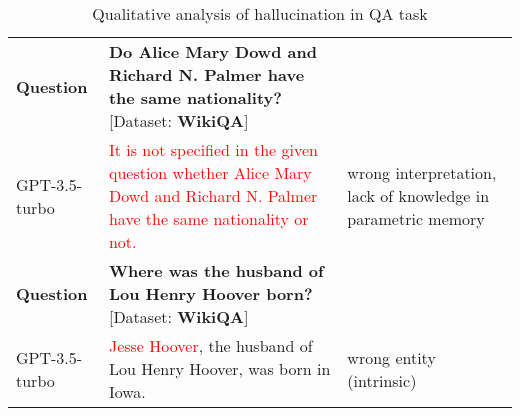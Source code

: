 \begin{table*}[!htbp]
\begin{tabular}{p{} p{} p{}}
\hline
\hline
\textbf{Question}  & \textbf{Do Alice Mary Dowd and Richard N. Palmer have the same nationality?} [Dataset: \textbf{WikiQA}]  \\
GPT-3.5-turbo  & \textcolor{red}{It is not specified in the given question whether Alice Mary Dowd and Richard N. Palmer have the same nationality or not.} & wrong interpretation, lack of knowledge in parametric memory  \\

\hline
\hline
\textbf{Question}  & \textbf{Where was the husband of Lou Henry Hoover born?} [Dataset: \textbf{WikiQA}]  \\
GPT-3.5-turbo  &  \textcolor{red}{Jesse Hoover}, the husband of Lou Henry Hoover, was born in Iowa. & wrong entity (intrinsic)\\

\end{tabular}
\caption{Qualitative analysis of hallucination in QA task}
\label{tab:qualitative}
\end{table*}